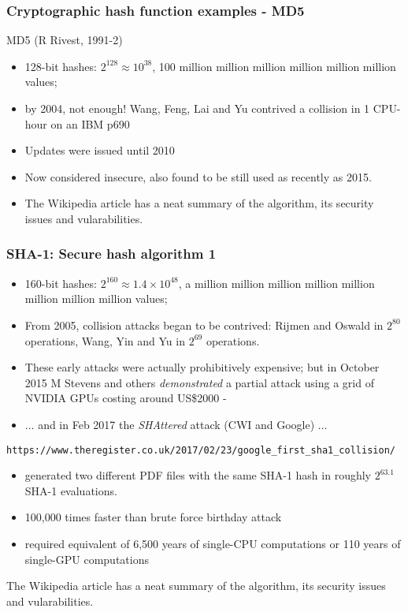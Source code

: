 \documentclass[10pt, hyperref={pdfpagelabels=false}]{beamer}
\begin{document}
\begin{frame}
\frametitle{Cryptographic hash function examples - MD5}
MD5 (R Rivest, 1991-2)
\begin{itemize}
\item 128-bit hashes: $2^{128} \approx 10^{38}$, 100 million million million million million million values; 
\item by 2004, not enough! Wang, Feng, Lai and Yu contrived a collision in 1 CPU-hour on an IBM p690
\item Updates were issued until 2010
\item Now considered insecure, also found to be still used as recently as 2015.
\item The Wikipedia article has a neat summary of the algorithm, its security issues and vularabilities. 
\end{itemize}
\end{frame}

\begin{frame}
\frametitle{SHA-1: Secure hash algorithm 1}
\begin{itemize}
\item 160-bit hashes: $2^{160} \approx 1.4 \times 10^{48}$, a million million million million million million million million values; 
\item From 2005, collision attacks began to be contrived: Rijmen and Oswald in $2^{80}$ operations, Wang, Yin and Yu in $2^{69}$ operations.
\item These early attacks were actually prohibitively expensive; but in October 2015 M Stevens and others \emph{demonstrated} a partial attack using a grid of NVIDIA GPUs costing around US\$2000 - 
\item ... and in Feb 2017 the \emph{SHAttered} attack (CWI and Google) ...
\end{itemize}
\texttt{\small\color{blue}https://www.theregister.co.uk/2017/02/23/google\_first\_sha1\_collision/}
\begin{itemize}
\item generated two different PDF files with the same SHA-1 hash in roughly $2^{63.1}$ SHA-1 evaluations. 
\item 100,000 times faster than brute force birthday attack
\item required equivalent of 6,500 years of single-CPU computations or 110 years of single-GPU computations
\end{itemize}

The Wikipedia article has a neat summary of the algorithm, its security issues and vularabilities. 
\end{frame}
\end{document}
